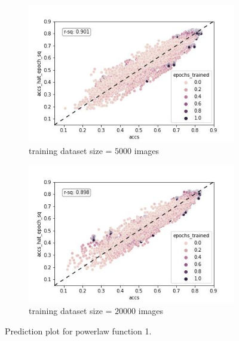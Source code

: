\documentclass{article} %
\begin{document}
\begin{figure}
    \begin{subfigure}{.5\textwidth}
      \centering
      \includegraphics[width=.8\linewidth]{powerlaw_train_accs_hat_epoch_sq}
      \caption{training dataset size = $5000$ images}
      \label{fig:powerlaw_acc_hat_epoch_sq_train}
    \end{subfigure}%
    \begin{subfigure}{.5\textwidth}
      \centering
      \includegraphics[width=.8\linewidth]{powerlaw_val_accs_hat_epoch_sq}
      \caption{training dataset size = $20000$ images}
      \label{fig:powerlaw_acc_hat_epoch_sq_val}
    \end{subfigure}
    \caption{Prediction plot for powerlaw function 1.}
    \label{fig:powerlaw_acc_hat_epoch_sq}
\end{figure}
\end{document}
